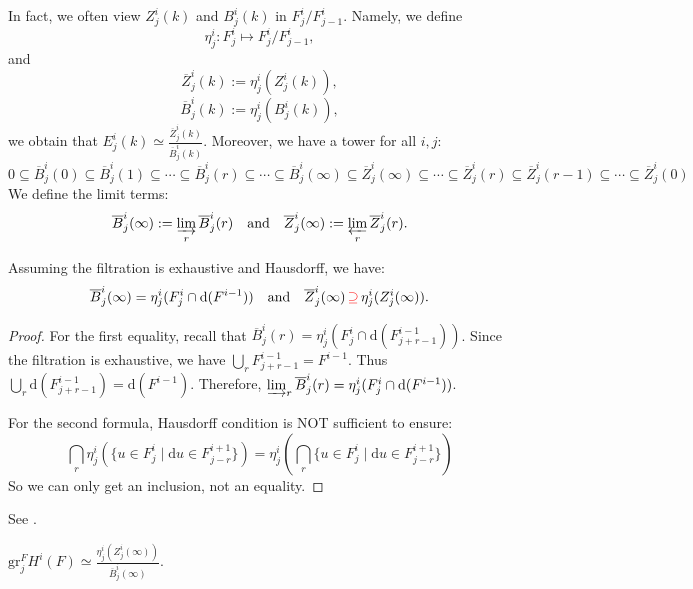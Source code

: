 In fact, we often view $Z^{i}_{j}(k)$ and $B^{i}_{j}(k)$ in $F^{i}_{j} /F^{i}_{j-1}$. Namely, we define
$$\eta^{i}_{j}:F^{i}_{j}\mapsto F^{i}_{j} /F^{i}_{j-1},$$
and
$$\overline{Z}^{i}_{j}(k):=\eta^{i}_{j}(Z^{i}_{j}(k)),$$
$$\overline{B}^{i}_{j}(k):=\eta^{i}_{j}(B^{i}_{j}(k)),$$
we obtain that $E^{i}_{j}(k)\simeq \frac{\overline{Z}^{i}_{j}(k)}{\overline{B}^{i}_{j}(k)}$. Moreover, we have a tower for all $i,j:$ $$
    0 \subseteq \overline{B}_j^i(0) \subseteq \overline{B}_j^i(1) \subseteq \cdots \subseteq \overline{B}_j^i(r) \subseteq \cdots \subseteq \overline{B}_j^i(\infty)
    \subseteq \overline{Z}_j^i(\infty) \subseteq \cdots \subseteq \overline{Z}_j^i(r) \subseteq \overline{Z}_j^i(r-1) \subseteq \cdots \subseteq \overline{Z}_j^i(0)
$$
We define the limit terms:
\[
    \overline{B}_j^i(\infty) := \varinjlim_{r} \overline{B}_j^i(r) \quad \text{and} \quad \overline{Z}_j^i(\infty) := \varprojlim_{r} \overline{Z}_j^i(r).
\]

\begin{lemma}
    Assuming the filtration is exhaustive and Hausdorff, we have:
    \[
        \overline{B}_j^i(\infty) = \eta_j^i(F_j^i \cap \mathrm{d}(F^{i-1}))
        \quad \text{and} \quad \overline{Z}_j^i(\infty)
        \, \textcolor{red}{\supseteq}\, \eta_j^i(Z_j^i(\infty)).
    \]
\end{lemma}
\begin{proof}
    For the first equality, recall that $\overline{B}_j^i(r) = \eta_j^i(F_j^i \cap \mathrm{d}(F_{j+r-1}^{i-1}))$.
    Since the filtration is exhaustive, we have $\bigcup_{r} F_{j+r-1}^{i-1} = F^{i-1}$.
    Thus $\bigcup_{r} \mathrm{d}(F_{j+r-1}^{i-1}) = \mathrm{d}(F^{i-1})$.
    Therefore, $\varinjlim_{r} \overline{B}_j^i(r) = \eta_j^i(F_j^i \cap \mathrm{d}(F^{i-1}))$.

    For the second formula, Hausdorff condition is NOT sufficient to ensure:
    \[
        \bigcap_{r}\eta_j^i(\{u \in F_j^i \mid \mathrm{d}u \in F_{j-r}^{i+1}\}) = \eta_j^i\left(\bigcap_{r}\{u \in F_j^i \mid \mathrm{d}u \in F_{j-r}^{i+1}\}\right)
    \]
    So we can only get an inclusion, not an equality.
\end{proof}
\begin{remark}
    See \cite[the discussion above Lemma~5.5.7.]{Weibel1994HA}.
\end{remark}

\begin{proposition}\label{prop:Boardman's_convergence}
    $\mathrm{gr}_{j}^{F}H^{i}(F)\simeq \frac{\eta_j^i(Z_j^i(\infty))}{\overline{B}^{i}_{j}(\infty)}$.
\end{proposition}


